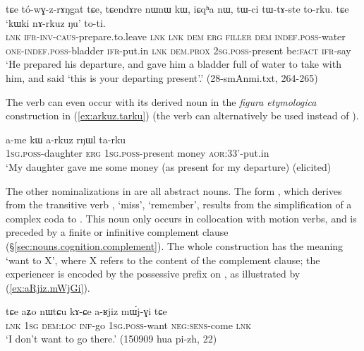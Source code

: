 \begin{exe}
\ex \label{ex:kWki.nArkuz.Nu}
\gll tɕe tó-wɣ-z-rɤŋgat tɕe, tɕendɤre nɯnɯ kɯ, iɕqʰa nɯ,  tɯ-ci tɯ-tɤ-ste to-rku. tɕe `kɯki nɤ-rkuz ŋu' to-ti. \\
\textsc{lnk} \textsc{ifr}-\textsc{inv}-\textsc{caus}-prepare.to.leave \textsc{lnk} \textsc{lnk} \textsc{dem} \textsc{erg} \textsc{filler} \textsc{dem} \textsc{indef}.\textsc{poss}-water \textsc{one}-\textsc{indef}.\textsc{poss}-bladder \textsc{ifr}-put.in \textsc{lnk} \textsc{dem}.\textsc{prox} \textsc{2sg}.\textsc{poss}-present be:\textsc{fact} \textsc{ifr}-say \\
\glt `He prepared his departure, and gave him a bladder full of water to take with him, and said `this is your departing present'.' (28-smAnmi.txt, 264-265)
\end{exe}


The verb  can even occur with its derived noun  in the \textit{figura etymologica} construction in (\ref{ex:arkuz.tarku}) (the verb  can alternatively be used instead of ).

\begin{exe}
\ex \label{ex:arkuz.tarku}
\gll a-me kɯ a-rkuz rŋɯl ta-rku \\
\textsc{1sg}.\textsc{poss}-daughter \textsc{erg} \textsc{1sg}.\textsc{poss}-present money \textsc{aor}:3\fl{}3'-put.in \\
\glt `My daughter gave me some money (as present for my departure) (elicited)
\end{exe}

The other nominalizations in  are all abstract nouns. The form , which derives from the transitive verb , `miss', `remember', results from the simplification of a complex coda  to . This noun only occurs in collocation with motion verbs, and is preceded by a finite or infinitive complement clause (§\ref{sec:nouns.cognition.complement}). The whole construction has the meaning `want to X', where X refers to the content of the complement clause; the experiencer is encoded by the possessive prefix on , as illustrated by (\ref{ex:aRjiz.mWjGi}).

\begin{exe}
\ex \label{ex:aRjiz.mWjGi}
\gll  tɕe aʑo nɯtɕu kɤ-ɕe a-ʁjiz mɯ́j-ɣi tɕe \\
\textsc{lnk} \textsc{1sg} \textsc{dem}:\textsc{loc} \textsc{inf}-go \textsc{1sg}.\textsc{poss}-want \textsc{neg}:\textsc{sens}-come \textsc{lnk} \\
\glt `I don't want to go there.' (150909 hua pi-zh, 22)
\end{exe}

